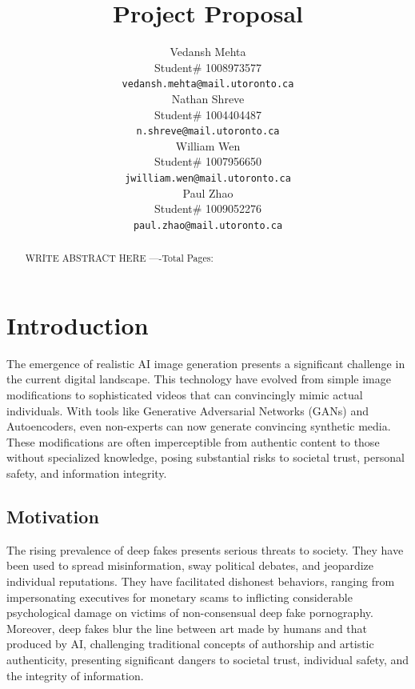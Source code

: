 \documentclass{article} %
\title{Project Proposal}
\author{Vedansh Mehta  \\
Student\# 1008973577 \\
\texttt{vedansh.mehta@mail.utoronto.ca} \\
\And
Nathan Shreve  \\
Student\# 1004404487 \\
\texttt{n.shreve@mail.utoronto.ca} \\
\AND
William Wen  \\
Student\# 1007956650 \\
\texttt{jwilliam.wen@mail.utoronto.ca} \\
\And
Paul Zhao \\
Student\# 1009052276 \\
\texttt{paul.zhao@mail.utoronto.ca} \\
\AND
}
\begin{document}
\maketitle

\begin{abstract}
WRITE ABSTRACT HERE
----Total Pages: \pageref{last_page}
\end{abstract}



\section{Introduction}
\label{intro}

The emergence of realistic AI image generation presents a significant challenge in the current digital landscape. This technology have evolved from simple image modifications to sophisticated videos that can convincingly mimic actual individuals. With tools like Generative Adversarial Networks (GANs) and Autoencoders, even non-experts can now generate convincing synthetic media. These modifications are often imperceptible from authentic content to those without specialized knowledge, posing substantial risks to societal trust, personal safety, and information integrity.


\subsection{Motivation}
The rising prevalence of deep fakes presents serious threats to society. They have been used to spread misinformation, sway political debates, and jeopardize individual reputations. They have facilitated dishonest behaviors, ranging from impersonating executives for monetary scams to inflicting considerable psychological damage on victims of non-consensual deep fake pornography. Moreover, deep fakes blur the line between art made by humans and that produced by AI, challenging traditional concepts of authorship and artistic authenticity, presenting significant dangers to societal trust, individual safety, and the integrity of information.
\end{document}
